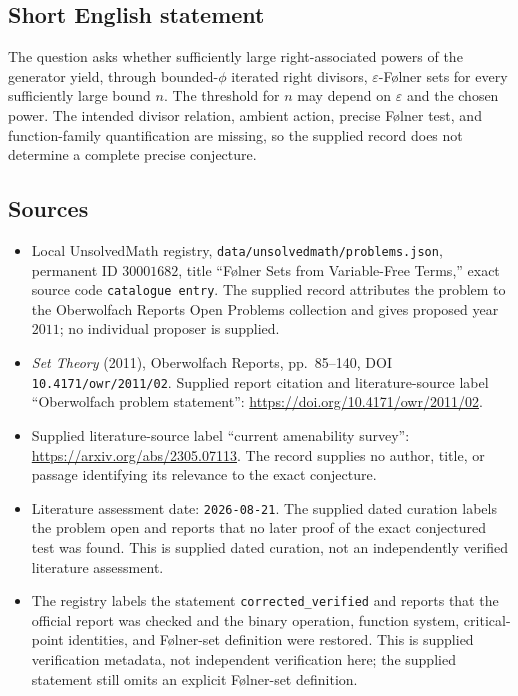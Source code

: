 \documentclass[11pt]{article}
\begin{document}
\subsection{Short English statement}
The question asks whether sufficiently large right-associated powers of the generator yield, through bounded-\(\phi\) iterated right divisors, \(\varepsilon\)-F\o lner sets for every sufficiently large bound \(n\). The threshold for \(n\) may depend on \(\varepsilon\) and the chosen power. The intended divisor relation, ambient action, precise F\o lner test, and function-family quantification are missing, so the supplied record does not determine a complete precise conjecture.
\subsection{Sources}
\begin{itemize}
\item Local UnsolvedMath registry, \texttt{data/unsolvedmath/problems.json}, permanent ID \(30001682\), title ``F\o lner Sets from Variable-Free Terms,'' exact source code \texttt{catalogue entry}. The supplied record attributes the problem to the Oberwolfach Reports Open Problems collection and gives proposed year \(2011\); no individual proposer is supplied.
\item \emph{Set Theory} (2011), Oberwolfach Reports, pp.\ 85--140, DOI \texttt{10.4171/owr/2011/02}. Supplied report citation and literature-source label ``Oberwolfach problem statement'': \url{https://doi.org/10.4171/owr/2011/02}.
\item Supplied literature-source label ``current amenability survey'': \url{https://arxiv.org/abs/2305.07113}. The record supplies no author, title, or passage identifying its relevance to the exact conjecture.
\item Literature assessment date: \texttt{2026-08-21}. The supplied dated curation labels the problem open and reports that no later proof of the exact conjectured test was found. This is supplied dated curation, not an independently verified literature assessment.
\item The registry labels the statement \texttt{corrected\_verified} and reports that the official report was checked and the binary operation, function system, critical-point identities, and F\o lner-set definition were restored. This is supplied verification metadata, not independent verification here; the supplied statement still omits an explicit F\o lner-set definition.
\end{itemize}
\end{document}
